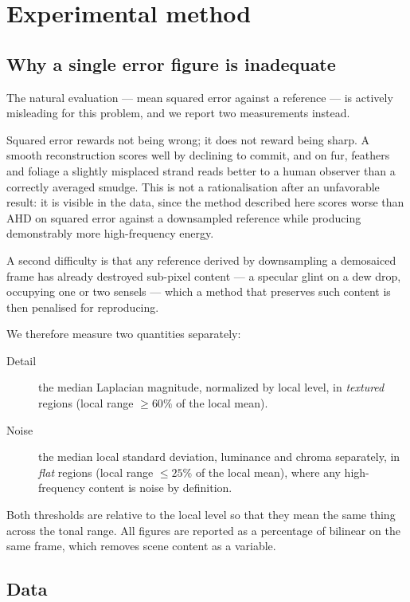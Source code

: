 \documentclass[10pt,a4paper]{article}
\begin{document}
\section{Experimental method}

\subsection{Why a single error figure is inadequate}

The natural evaluation --- mean squared error against a reference --- is
actively misleading for this problem, and we report two measurements instead.

Squared error rewards not being wrong; it does not reward being sharp. A smooth
reconstruction scores well by declining to commit, and on fur, feathers and
foliage a slightly misplaced strand reads better to a human observer than a
correctly averaged smudge. This is not a rationalisation after an unfavorable
result: it is visible in the data, since the method described here scores worse
than AHD on squared error against a downsampled reference while producing
demonstrably more high-frequency energy.

A second difficulty is that any reference derived by downsampling a demosaiced
frame has already destroyed sub-pixel content --- a specular glint on a dew
drop, occupying one or two sensels --- which a method that preserves such
content is then penalised for reproducing.

We therefore measure two quantities separately:

\begin{description}
\item[Detail] the median Laplacian magnitude, normalized by local level, in
  \emph{textured} regions (local range $\ge 60\%$ of the local mean).
\item[Noise] the median local standard deviation, luminance and chroma
  separately, in \emph{flat} regions (local range $\le 25\%$ of the local mean),
  where any high-frequency content is noise by definition.
\end{description}

Both thresholds are relative to the local level so that they mean the same
thing across the tonal range. All figures are reported as a percentage of
bilinear on the same frame, which removes scene content as a variable.

\subsection{Data}
\end{document}
